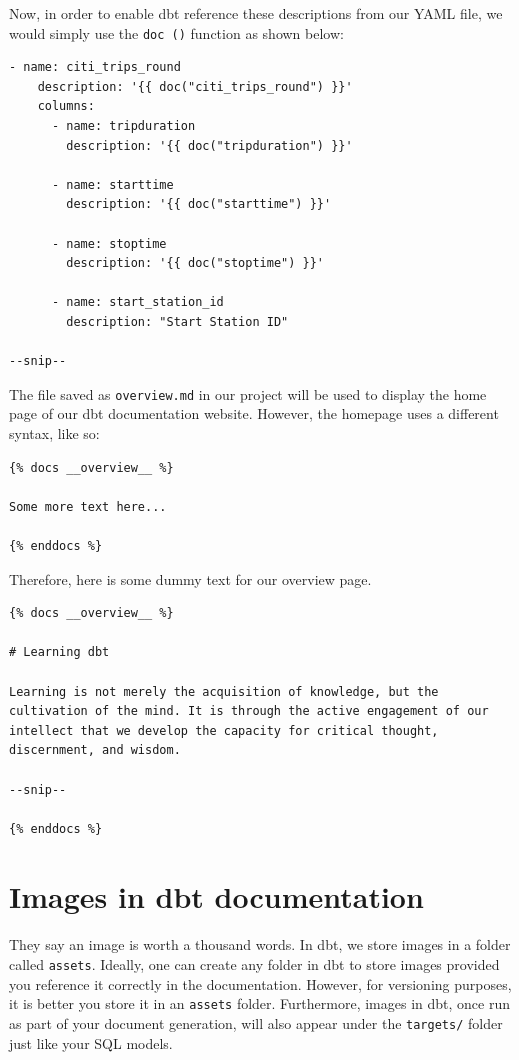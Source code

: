 \documentclass[
]{book}
\begin{document}
Now, in order to enable dbt reference these descriptions from our YAML file, we would simply use the \texttt{doc\ ()} function as shown below:

\begin{verbatim}
- name: citi_trips_round
    description: '{{ doc("citi_trips_round") }}'
    columns:
      - name: tripduration
        description: '{{ doc("tripduration") }}'

      - name: starttime
        description: '{{ doc("starttime") }}'
      
      - name: stoptime
        description: '{{ doc("stoptime") }}'

      - name: start_station_id
        description: "Start Station ID"
        
--snip--
\end{verbatim}

The file saved as \texttt{overview.md} in our project will be used to display the home page of our dbt documentation website. However, the homepage uses a different syntax, like so:

\begin{verbatim}
{% docs __overview__ %}

Some more text here...

{% enddocs %}
\end{verbatim}

Therefore, here is some dummy text for our overview page.

\begin{verbatim}
{% docs __overview__ %}

# Learning dbt

Learning is not merely the acquisition of knowledge, but the cultivation of the mind. It is through the active engagement of our intellect that we develop the capacity for critical thought, discernment, and wisdom. 

--snip--

{% enddocs %}
\end{verbatim}

\hypertarget{images-in-dbt-documentation}{%
\section{Images in dbt documentation}\label{images-in-dbt-documentation}}

They say an image is worth a thousand words. In dbt, we store images in a folder called \texttt{assets}. Ideally, one can create any folder in dbt to store images provided you reference it correctly in the documentation. However, for versioning purposes, it is better you store it in an \texttt{assets} folder. Furthermore, images in dbt, once run as part of your document generation, will also appear under the \texttt{targets/} folder just like your SQL models.
\end{document}
